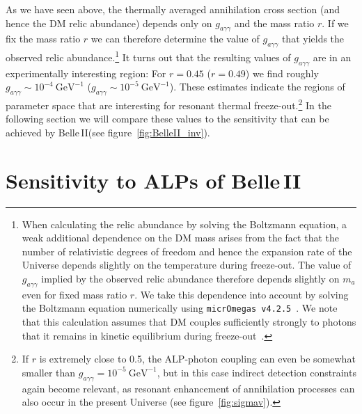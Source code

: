 \documentclass[11pt,a4paper]{article}
\newcommand{\ga}{g_{a\gamma\gamma}}
\def \belletwo {Belle\,II\xspace}
\begin{document}
As we have seen above, the thermally averaged annihilation cross section (and hence the DM relic abundance) depends only on $\ga$ and the mass ratio $r$. If we fix the mass ratio $r$ we can therefore determine the value of $\ga$ that yields the observed relic abundance.\footnote{When calculating the relic abundance by solving the Boltzmann equation, a weak additional dependence on the DM mass arises from the fact that the number of relativistic degrees of freedom and hence the expansion rate of the Universe depends slightly on the temperature during freeze-out. The value of $\ga$ implied by the observed relic abundance therefore depends slightly on $m_a$ even for fixed mass ratio $r$. We take this dependence into account by solving the Boltzmann equation numerically using \texttt{micrOmegas v4.2.5}~\cite{Belanger:2014vza}. We note that this calculation assumes that DM couples sufficiently strongly to photons that it remains in kinetic equilibrium during freeze-out~\cite{Binder:2017rgn}.} It turns out that the resulting values of $\ga$ are in an experimentally interesting region: For $r = 0.45$ ($r = 0.49$) we find roughly $\ga \sim 10^{-4}\:\mathrm{GeV^{-1}}$ ($\ga \sim 10^{-5}\:\mathrm{GeV^{-1}}$). These estimates indicate the regions of parameter space that are interesting for resonant thermal freeze-out.\footnote{If $r$ is extremely close to 0.5, the ALP-photon coupling can even be somewhat smaller than $\ga = 10^{-5}\:\mathrm{GeV^{-1}}$, but in this case indirect detection constraints again become relevant, as resonant enhancement of annihilation processes can also occur in the present Universe (see figure~\ref{fig:sigmav}).} In the following section we will compare these values to the sensitivity that can be achieved by \belletwo (see figure~\ref{fig:BelleII_inv}).

\section{Sensitivity to ALPs of \belletwo}
\label{sec:BelleII}
\end{document}
